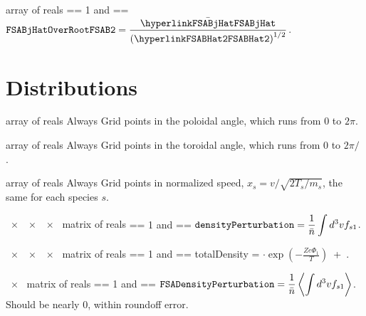 { array of reals}
{ == 1 and  == \true}
{$\displaystyle \text{\ttfamily FSABjHatOverRootFSAB2} =  \frac{\bar{\text{\parlink{FSABjHat}}}}{\left(\text{\parlink{FSABHat2}}\right)^{1/2}}$.}

\myhrule

\section{Distributions}
\label{sec:Distributions}

\myhrule

{ array of reals}
{Always}
{Grid points in the poloidal angle, which runs from $0$ to $2 \pi$.}

\myhrule

{ array of reals}
{Always}
{Grid points in the toroidal angle, which runs from $0$ to $2 \pi/$ .}

\myhrule

{ array of reals}
{Always}
{Grid points in normalized speed, $x_s = v / \sqrt{2 T_s / m_s}$, the same for each species $s$.}

\myhrule

{~$\times$~~$\times$~~$\times$~ matrix of reals}
{ == 1 and  == \true}
{$\displaystyle \text{\ttfamily densityPerturbation} =  \frac{1}{\bar{n}} \int d^3v f_{s1}$.}

\myhrule

{~$\times$~~$\times$~~$\times$~ matrix of reals}
{ == 1 and  == \true}
{{\ttfamily totalDensity} = $\cdot \exp \left(- \frac{Z e \Phi_1}{T}  \right)$~+~.}

\myhrule

{~$\times$~ matrix of reals}
{ == 1 and  == \true}
{$\displaystyle \text{\ttfamily FSADensityPerturbation} =  \frac{1}{\bar{n}} \left\langle \int d^3v f_{s1} \right\rangle$. 
Should be %
nearly 0, within roundoff error.}

